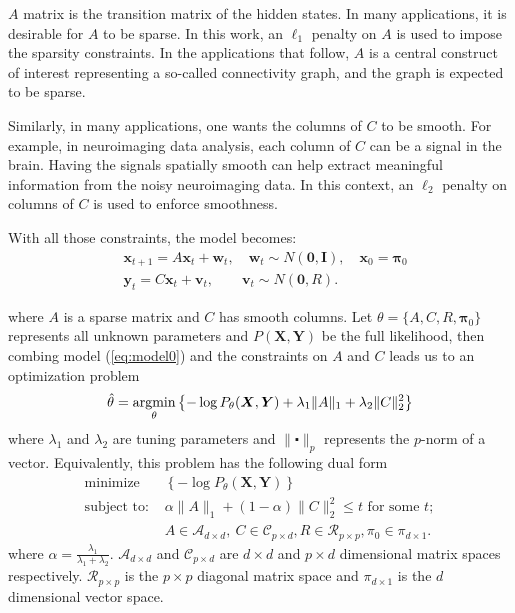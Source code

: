 \documentclass[fleqn,12pt]{article}
\let\oldref\ref
\renewcommand{\ref}[1]{(\oldref{#1})}
\newcommand{\argmin}{\operatornamewithlimits{argmin}}
\providecommand{\mb}[1]{\boldsymbol{#1}}
\newcommand{\bx}{\mb{x}}
\newcommand{\by}{\mb{y}}
\newcommand{\bX}{\mb{X}}
\newcommand{\bY}{\mb{Y}}
\begin{document}
$A$ matrix is the transition matrix of the hidden states. In many applications, it is desirable for $A$ to be sparse. In this work, an $\ell_1$ penalty on $A$ is used to impose the sparsity constraints. In the applications that follow, $A$ is a central construct of interest representing a so-called connectivity graph, and the graph is expected to be sparse.

Similarly, in many applications, one wants the columns of $C$ to be smooth. For example, in neuroimaging data analysis, each column of $C$ can be a signal in the brain. Having the signals spatially smooth can help extract meaningful information from the noisy neuroimaging data. In this context, an $\ell_2$ penalty on columns of $C$ is used to enforce smoothness.

With all those constraints, the model becomes:
\begin{equation}\label{eq:model0}
\begin{aligned}
	&\bx_{t+1}=A\bx_{t}+\mathbf{w}_t, \quad \mathbf{w}_t\sim N(\mathbf{0},\mathbf{I}),\quad \bx_0 = \mathbf{\pi}_0\\
	&\by_t=C\bx_t+\mathbf{v}_t,\qquad \mathbf{v}_t\sim N(\mathbf{0},R).
\end{aligned}
\end{equation}

where $A$ is a sparse matrix and $C$ has smooth columns.
Let $\theta =\{A,C,R,\mathbf{\pi}_0\}$ represents all unknown parameters and $P(\bX,\bY)$ be the full likelihood, then combing model \ref{eq:model0} and the constraints on $A$ and $C$ leads us to an optimization problem
\begin{equation}\label{eqn:penaltylik}
\hat{\theta}=\argmin_{\substack{\theta}}\left\{-\log P_\theta(\bX,\bY)+\lambda_1\|A\|_1+\lambda_2\|C\|_2^2\right\}
\end{equation}
where $\lambda_1$ and $\lambda_2$ are tuning parameters and $\|\centerdot\|_p$ represents the $p$-norm of a vector. Equivalently, this problem has the following dual form
\begin{equation*}\label{eqn:penaltylikdual}
\begin{aligned}
&\text{minimize}&\left\{-\log P_\theta(\bX,\bY)\right\}&\\
&\text{subject to: }
& \alpha\|A\|_1+ (1-\alpha)\|C\|_2^2 \leq t \text{ for some }t; &\\
&& A\in \mathcal{A}_{d\times d},\ C \in \mathcal{C}_{p \times d}, R \in \mathcal{R}_{p\times p}, \pi_0 \in \mathcal{\pi}_{d\times 1}.&
\end{aligned}
\end{equation*}
where $\alpha = \frac{\lambda_1}{\lambda_1 + \lambda_2}$. $\mathcal{A}_{d\times d}$ and $\mathcal{C}_{p \times d}$ are $d\times d$ and $p \times d$ dimensional matrix spaces respectively. $\mathcal{R}_{p \times p}$ is the $p \times p$ diagonal matrix space and $\mathcal{\pi}_{d\times 1}$ is the $d$ dimensional vector space.
\end{document}
